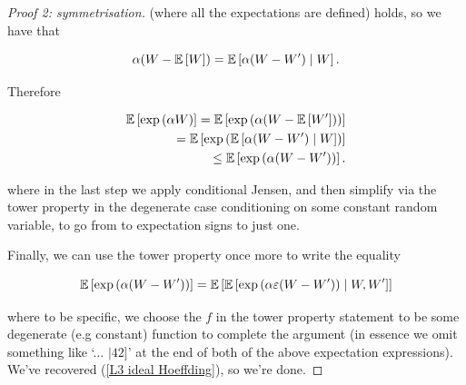 \documentclass[11pt]{scrartcl}
\begin{document}
\begin{proof}[Proof 2: symmetrisation]
(where all the expectations are defined) holds, so we have that 

\begin{equation}
    \alpha (W - \mathbb{E} \left[ W \right]) = \mathbb{E} \left[ \alpha(W-W') \mid W \right].
\end{equation}

Therefore

\begin{align}
    \E{\exp{\alpha W}} = \E{\exp{\alpha (W-\E{W'})}} \\
    = \E{\exp{\E{\alpha(W-W') \mid W}}} \\
    \le \E{\exp{\alpha (W-W')}}. %
\end{align}

where in the last step we apply conditional Jensen, and then simplify via the tower property in the degenerate case conditioning on some constant random variable, to go from to expectation signs to just one.

Finally, we can use the tower property once more to write the equality

\begin{equation}
    \mathbb{E} \left[ \text{exp} \left( \alpha (W-W') \right) \right] = \mathbb{E} \left[ \mathbb{E} \left[  \text{exp} \left( \alpha \varepsilon (W-W') \right) \mid W, W'  \right] \right]
\end{equation}

where to be specific, we choose the $f$ in the tower property statement to be some degenerate (e.g constant) function to complete the argument (in essence we omit something like `... $\mid 42]$' at the end of both of the above expectation expressions). We've recovered (\ref{L3 ideal Hoeffding}), so we're done.
\end{proof}





\end{document}
